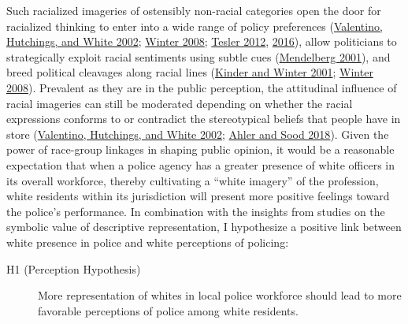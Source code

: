 \documentclass[
  12pt,
]{article}
\begin{document}
Such racialized imageries of ostensibly non-racial categories open the
door for racialized thinking to enter into a wide range of policy
preferences (\protect\hyperlink{ref-valentino2002}{Valentino, Hutchings,
and White 2002}; \protect\hyperlink{ref-winter2008}{Winter 2008};
\protect\hyperlink{ref-tesler2012}{Tesler 2012},
\protect\hyperlink{ref-tesler2016}{2016}), allow politicians to
strategically exploit racial sentiments using subtle cues
(\protect\hyperlink{ref-mendelberg2001}{Mendelberg 2001}), and breed
political cleavages along racial lines
(\protect\hyperlink{ref-kinder2001}{Kinder and Winter 2001};
\protect\hyperlink{ref-winter2008}{Winter 2008}). Prevalent as they are
in the public perception, the attitudinal influence of racial imageries
can still be moderated depending on whether the racial expressions
conforms to or contradict the stereotypical beliefs that people have in
store (\protect\hyperlink{ref-valentino2002}{Valentino, Hutchings, and
White 2002}; \protect\hyperlink{ref-ahler2018}{Ahler and Sood 2018}).
Given the power of race-group linkages in shaping public opinion, it
would be a reasonable expectation that when a police agency has a
greater presence of white officers in its overall workforce, thereby
cultivating a ``white imagery'' of the profession, white residents
within its jurisdiction will present more positive feelings toward the
police's performance. In combination with the insights from studies on
the symbolic value of descriptive representation, I hypothesize a
positive link between white presence in police and white perceptions of
policing:

\begin{description}
\item[H1 (Perception Hypothesis)]
More representation of whites in local police workforce should lead to
more favorable perceptions of police among white residents.
\end{description}
\end{document}
